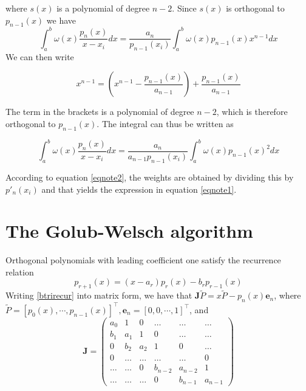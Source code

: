  where $s(x)$ is a polynomial of degree $n - 2$. Since $s(x)$ is orthogonal to $p_{n-1}(x)$ we have
\begin{equation}
 \int_{a}^{b}\omega(x)\frac{p_{n}(x)}{x-x_{i}}dx=\frac{a_{n}}{p_{n-1}(x_{i})}\int_{a}^{b}\omega(x)p_{n-1}(x)x^{n-1}dx
\end{equation}
We can then write

\begin{equation}
    x^{n-1} = \left(x^{n-1} - \frac{p_{n-1}(x)}{a_{n-1}}\right) + \frac{p_{n-1}(x)}{a_{n-1}}
\end{equation}

The term in the brackets is a polynomial of degree $n-2$, which is therefore orthogonal to $p_{n-1}(x)$. The integral can thus be written as

\begin{equation}
    \int_{a}^{b}\omega(x)\frac{p_{n}(x)}{x-x_{i}}dx=\frac{a_{n}}{a_{n-1}p_{n-1}(x_{i})}\int_{a}^{b}\omega(x)p_{n-1}(x)^{2}dx 
\end{equation}

According to equation \ref{eqnote2}, the weights are obtained by dividing this by $p'_{n}(x_{i})$ and that yields the expression in equation \ref{eqnote1}.

\section{The Golub-Welsch algorithm}
\label{gwalg}
Orthogonal polynomials with leading coefficient one satisfy the recurrence relation 
\begin{equation}
    \label{btrirecur}
    p_{r+1}(x) = (x-a_r)p_r(x) -b_r p_{r-1}(x)
\end{equation}
Writing \ref{btrirecur} into matrix form, we have that $\mathbf{J}\tilde{P}=x\tilde{P}-p_n(x) \mathbf{e}_n$, where $\tilde{P}=[p_0(x),\cdots,p_{n-1}(x)]^\top, \mathbf{e}_n=[0,0,\cdots,1]^\top$, and 
\begin{equation}
    \mathbf{J}=\begin{pmatrix}
        a_0 &      1 &      0 &  \ldots &  \ldots &  \ldots \\
        b_1 &    a_1 &      1 &       0 &  \ldots &  \ldots \\
          0 &    b_2 &    a_2 &       1 &       0 &  \ldots \\
          0 & \ldots & \ldots &  \ldots &  \ldots &       0 \\
     \ldots & \ldots &      0 & b_{n-2} & a_{n-2} &       1 \\
     \ldots & \ldots & \ldots &       0 & b_{n-1} & a_{n-1}
   \end{pmatrix}
\end{equation}

